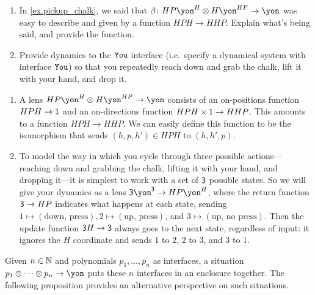 \documentclass[Book-Poly]{subfiles}
\begin{document}
\begin{exercise}\label{exc.pickup_chalk}
\begin{enumerate}
	\item In \cref{ex.pickup_chalk}, we said that $\beta\colon HP\yon^H\otimes H\yon^{HP}\to\yon$ was easy to describe and given by a function $HPH\to HHP$. Explain what's being said, and provide the function.
	\item Provide dynamics to the $\texttt{You}$ interface (i.e.\ specify a dynamical system with interface $\texttt{You}$) so that you repeatedly reach down and grab the chalk, lift it with your hand, and drop it. 
\qedhere
\end{enumerate}
\begin{solution}
\begin{enumerate}
    \item A lens $HP\yon^H \otimes H\yon^{HP} \to \yon$ consists of an on-positions function $HPH \to \textsf{1}$ and an on-directions function $HPH \times \textsf{1} \to HHP$.
    This amounts to a function $HPH \to HHP$.
    We can easily define this function to be the isomorphism that sends $(h,p,h') \in HPH$ to $(h,h',p)$.
    \item To model the way in which you cycle through three possible actions---reaching down and grabbing the chalk, lifting it with your hand, and dropping it---it is simplest to work with a set of $\textsf{3}$ possible states.
    So we will give your dynamics as a lens $\3\yon^\3 \to HP\yon^H$, where the return function $\textsf{3} \to HP$ indicates what happens at each state, sending $1 \mapsto (\text{down, press}), 2 \mapsto (\text{up, press})$, and $3 \mapsto (\text{up, no press})$.
    Then the update function $\textsf{3}H \to \textsf{3}$ always goes to the next state, regardless of input: it ignores the $H$ coordinate and sends $1$ to $2$, $2$ to $3$, and $3$ to $1$.
\end{enumerate}
\end{solution}
\end{exercise}

Given $n\in\mathbb{N}$ and polynomials $p_1,\ldots,p_n$ as interfaces, a situation $p_1\otimes\cdots\otimes p_n\to\yon$ puts these $n$ interfaces in an enclosure together.
The following proposition provides an alternative perspective on such situations.
\end{document}

